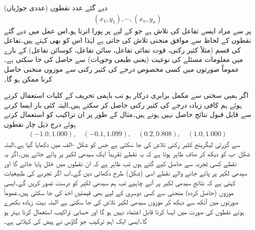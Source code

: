 دیے گئے  عدد نقطوں (عددی جوڑیاں)
\begin{align*}
(x_1,y_1),\cdots,(x_n,y_n)
\end{align*}
پر   سے مراد ایسے تفاعل  کی تلاش ہے  جو   کے لیے  پر پورا اترتا ہو۔اس عمل میں دیے گئے نقطوں کے لحاظ سے موافق منحنی تلاش کی جاتی ہے لہٰذا اس  کو   بھی کہتے ہیں۔تفاعل کی قسم (مثلاً کثیر رکنی، قوت نمائی تفاعل، سائن تفاعل، کوسائن تفاعل) کے بارے میں معلومات مسئلے کی نوعیت (یعنی طبعی وجوہات) سے حاصل کی جا سکتی ہے۔عموماً صورتوں میں کسی مخصوص درجے کی کثیر رکنی سے  موزوں منحنی حاصل کرنا ممکن ہو گا۔

 اگر ہمیں  سختی سے  مکمل برابری   درکار ہو تب باہمی تحریف کے کلیات استعمال کرتے ہوئے  ہم کافی زیادہ درجے کی کثیر رکنی  حاصل کر سکتے ہیں۔البتہ کئی بار ایسا کرنے سے  قابل قبول نتائج حاصل نہیں ہوتے ہیں۔مثال کے طور پر ان تراکیب کو استعمال کرتے ہوئے درج ذیل چار نقطوں
\begin{align}\label{مساوات_خطی_اعدادی_کمتر_مربع_شرائط_الف}
(-1.0,1.000),\quad (-0.1,1.099),\quad (0.2,0.808),\quad (1.0,1.000)
\end{align}
سے گزرتی لیگرینج کثیر رکنی  تلاش کی جا سکتی ہے جس کو شکل -الف میں دکھایا گیا ہے۔البتہ شکل -ب کو دیکھ کر صاف ظاہر ہوتا ہے کہ یہ نقطے تقریباً ایک سیدھی لکیر پر پائے جاتے ہیں۔اگر یہ نقطے کسی تجربہ سے حاصل کیے گئے ہوں تب ظاہر ہے کہ ان نقطوں میں خلل پایا جائے گا اور سیدھی لکیر پر پائے جانے والے نقطے اسی  (شکل) طرح دکھائی دیں گے۔اب اگر تجربے کی طبیعیات کہتی ہے کہ نتائج سیدھی لکیر پر آنے چاہیے تب ہم سیدھی لکیر کو درست تصور کریں گے۔ایسی موزوں (حاصل کردہ) منحنی سے کسی دوسری  کے لیے بھی قیمتیں اخذ کی جا سکتی ہیں۔عموماً صورتوں میں آنکھ سے دیکھ کر موزوں سیدھی لکیر تلاش کی جا سکتی ہے البتہ بہت زیادہ بکھرے  ہوئے نقطوں کی صورت میں ایسا کرنا قابل اعتماد نہیں ہو گا اور حسابی تراکیب استعمال کرنا بہتر ہو گا۔ایسی ایک اہم ترکیب جو گاؤس نے پیش کی   کہلاتی ہے۔
